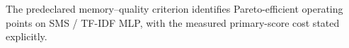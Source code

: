 The predeclared memory--quality criterion identifies Pareto-efficient operating points on SMS / TF-IDF MLP, with the measured primary-score cost stated explicitly.
